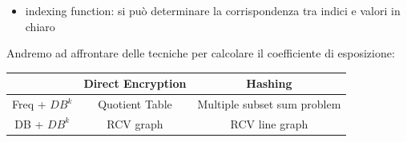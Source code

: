 \begin{itemize}
    \item indexing function: si può determinare la corrispondenza tra indici e valori in chiaro 
\end{itemize}
Andremo ad affrontare delle tecniche per calcolare il coefficiente di esposizione:
\begin{table}[h!]
\centering
 \begin{tabular}{| c || c| c |} 
 \hline
  & Direct Encryption & Hashing \\ [0.5ex] 
 \hline\hline
 Freq + \(DB^k\) & Quotient Table & Multiple subset sum problem \\ 
 \hline
 DB + \(DB^k\) & RCV graph & RCV line graph \\ [1ex] 
 \hline
 \end{tabular}
\end{table}

